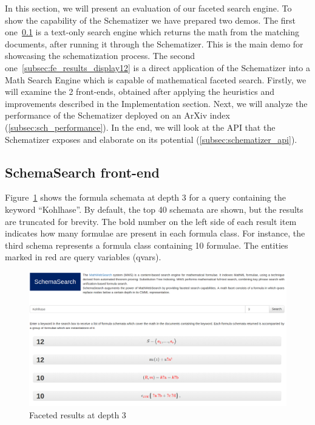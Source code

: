 \documentclass[a4paper,oneside]{article}
\def\arxiv{\textsf{ArXiv}\xspace}
\begin{document}
In this section, we will present an evaluation of our faceted search engine.
To show the capability of the Schematizer we have prepared two demos.
The first one~\ref{subsec:fe_results_display1} is a text-only search engine
which returns the math from the matching documents, after running it through
the Schematizer. This is the main demo for showcasing the schematization
process. The second one~\ref{subsec:fe_results_display12} is a direct
application of the Schematizer into a Math Search Engine which is capable of
mathematical faceted search.
Firstly, we will examine the 2 front-ends, obtained after applying the
heuristics and improvements described in the Implementation section. Next, we
will analyze the performance of the Schematizer deployed on an \arxiv index
(\ref{subsec:sch_performance}). In the end, we will look at the API that the
Schematizer exposes and elaborate on its potential
(\ref{subsec:schematizer_api}).

\subsection{SchemaSearch front-end}\label{subsec:fe_results_display1}
Figure~\ref{fig:schemata_group} shows the formula schemata at depth 3 for a
query containing the keyword ``Kohlhase''. By default, the top 40 schemata are
shown, but the results are truncated for brevity.
The bold number on the left side of each result item indicates how many
formulae are present in each formula class. For instance, the third schema
represents a formula class containing 10 formulae. The entities marked in red
are query variables (qvars).

\begin{figure}[ht]\centering
    \includegraphics[width=12.8cm]{img/schemataGroup.png}
    \caption{Faceted results at depth 3}\label{fig:schemata_group}
\end{figure}
\FloatBarrier
\end{document}
